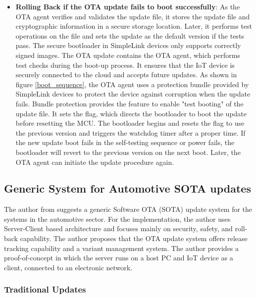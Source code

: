 \documentclass[12pt,a4paper]{article}
\begin{document}
\begin{itemize}
\item \textbf{Rolling Back if the OTA update fails to boot successfully}: As the OTA agent verifies and validates the update file, it stores the update file and cryptographic information in a secure storage location. Later, it performs test operations on the file and sets the update as the default version if the tests pass. The secure bootloader in SimpleLink devices only supports correctly signed images. The OTA update contains the OTA agent, which performs test checks during the boot-up process. It ensures that the IoT device is securely connected to the cloud and accepts future updates. As shown in figure \ref{boot_sequence}, the OTA agent uses a protection bundle provided by SimpleLink devices to protect the device against corruption when the update fails. Bundle protection provides the feature to enable "test booting" of the update file. It sets the flag, which directs the bootloader to boot the update before resetting the MCU. The bootloader begins and resets the flag to use the previous version and triggers the watchdog timer after a proper time. If the new update boot fails in the self-testing sequence or power fails, the bootloader will revert to the previous version on the next boot. Later, the OTA agent can initiate the update procedure again. \cite{r27}

\end{itemize}


\subsection{Generic System for Automotive SOTA updates }

The author from \cite{r28} suggests a generic Software OTA (SOTA) update system for the systems in the automotive sector. For the implementation, the author uses Server-Client based architecture and focuses mainly on security, safety, and roll-back capability. The author proposes that the OTA update system offers release tracking capability and a variant management system. The author provides a proof-of-concept in which the server runs on a host PC and IoT device as a client, connected to an electronic network. \cite{r28} \\

\subsubsection{Traditional Updates}
\end{document}

